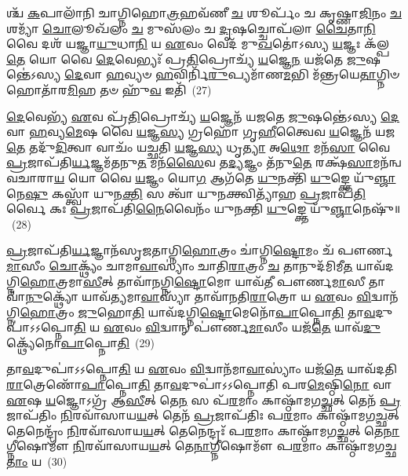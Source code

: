 𑌶𑍍𑌚᳴ \ul{𑌕}\-𑌪𑌾𑌲𑌾᳴𑌨𑌿 𑌚𑌾𑌗𑍍𑌨𑌿𑌹𑍋\-\ul{𑌤𑍍𑌰}\-𑌹𑌵᳴𑌣𑍀 \ul{𑌚} 𑌶𑍂𑌰𑍍𑌪𑌂᳴ 𑌚 𑌕𑍃𑌷𑍍𑌣𑌾\-\ul{𑌜𑌿}\-𑌨𑌂 \ul{𑌚} 𑌶𑌮𑍍𑌯𑌾᳴ \ul{𑌚𑍋}\-𑌲𑍂𑌖᳴𑌲𑌂 \ul{𑌚} 𑌮𑍁𑌸᳴𑌲𑌂 𑌚 \ul{𑌦𑍃}\-𑌷𑌚𑍍𑌚𑍋𑌪᳴𑌲𑌾 \ul{𑌚𑍈}\-𑌤𑌾\-\ul{𑌨𑌿} 𑌵𑍈 𑌦𑌶᳴ 𑌯𑌜𑍍𑌞𑌾\-\ul{𑌯𑍁}\-𑌧𑌾\-\ul{𑌨𑌿} 𑌯 \ul{𑌏}\-𑌵𑌂 𑌵𑍇𑌦᳴ 𑌮𑍁\-\ul{𑌖}\-𑌤𑍋॑\-𑌽𑌸𑍍𑌯 \ul{𑌯}\-𑌜𑍍𑌞𑌃 𑌕᳴𑌲𑍍𑌪\-\ul{𑌤𑍇} 𑌯𑍋 𑌵𑍈 \ul{𑌦𑍇}\-𑌵𑍇𑌭𑍍𑌯𑌃᳴ 𑌪𑍍𑌰\-\ul{𑌤𑌿}\-𑌪𑍍𑌰𑍋𑌚𑍍𑌯᳴ \ul{𑌯}\-𑌜𑍍𑌞𑍇\-\ul{𑌨} 𑌯𑌜᳴𑌤𑍇 \ul{𑌜𑍁}\-𑌷𑌨𑍍𑌤𑍇॑\-𑌽𑌸𑍍𑌯 \ul{𑌦𑍇}\-𑌵𑌾 \ul{𑌹}\-𑌵𑍍𑌯𑍞 \ul{𑌹}\-𑌵𑌿𑌰𑍍𑌨𑌿᳴\-\ul{𑌰𑍁}\-𑌪𑍍𑌯𑌮𑌾᳴𑌣\-\ul{𑌮}\-𑌭𑌿 𑌮᳴𑌨𑍍𑌤𑍍𑌰𑌯𑍇\-\ul{𑌤𑌾}\-𑌗𑍍𑌨𑌿𑍞 𑌹𑍋𑌤𑌾᳴𑌰\-\ul{𑌮𑌿}\-𑌹 𑌤𑍞 𑌹𑍁᳴\-\ul{𑌵} 𑌇𑌤𑌿᳴~(27)

\-\ul{𑌦𑍇}\-𑌵𑍇𑌭𑍍𑌯᳴ \ul{𑌏}\-𑌵 𑌪𑍍𑌰᳴\-\ul{𑌤𑌿}\-𑌪𑍍𑌰𑍋𑌚𑍍𑌯᳴ \ul{𑌯}\-𑌜𑍍𑌞𑍇𑌨᳴ 𑌯𑌜𑌤𑍇 \ul{𑌜𑍁}\-𑌷𑌨𑍍𑌤𑍇॑\-𑌽𑌸𑍍𑌯 \ul{𑌦𑍇}\-𑌵𑌾 \ul{𑌹}\-𑌵𑍍𑌯\-\ul{𑌮𑍇}\-𑌷 𑌵𑍈 \ul{𑌯}\-𑌜𑍍𑌞\-\ul{𑌸𑍍𑌯} 𑌗𑍍𑌰𑌹𑍋᳴ 𑌗𑍃\-\ul{𑌹𑍀}\-𑌤𑍍𑌵𑍈𑌵 \ul{𑌯}\-𑌜𑍍𑌞𑍇𑌨᳴ 𑌯𑌜\-\ul{𑌤𑍇} 𑌤𑌦𑍁᳴\-\ul{𑌦𑌿}\-𑌤𑍍𑌵𑌾 𑌵𑌾𑌚𑌂᳴ 𑌯𑌚𑍍𑌛𑌤𑌿 \ul{𑌯}\-𑌜𑍍𑌞\-\ul{𑌸𑍍𑌯} 𑌧𑍃\-\ul{𑌤𑍍𑌯𑌾} 𑌅\-\ul{𑌥𑍋} 𑌮𑌨᳴\-\ul{𑌸𑌾} 𑌵𑍈 \ul{𑌪𑍍𑌰}\-𑌜𑌾𑌪᳴𑌤𑌿\-\ul{𑌰𑍍𑌯}\-𑌜𑍍𑌞𑌮᳴𑌤𑌨𑍁\-\ul{𑌤} 𑌮𑌨᳴\-\ul{𑌸𑍈}\-𑌵 𑌤\-\ul{𑌦𑍍𑌯}\-𑌜𑍍𑌞𑌂 𑌤᳴𑌨𑍁\-\ul{𑌤𑍇} 𑌰𑌕𑍍𑌷᳴\-\ul{𑌸𑌾}\-𑌮𑌨᳴𑌨𑍍𑌵𑌵𑌚𑌾𑌰𑌾\-\ul{𑌯} 𑌯𑍋 𑌵𑍈 \ul{𑌯}\-𑌜𑍍𑌞𑌂 𑌯𑍋\-\ul{𑌗} 𑌆𑌗᳴𑌤𑍇 \ul{𑌯𑍁}\-𑌨𑌕𑍍𑌤𑌿᳴ \ul{𑌯𑍁}\-𑌙𑍍𑌕𑍍𑌤𑍇 𑌯𑍁᳴\-\ul{𑌞𑍍𑌜𑌾}\-𑌨𑍇\-\ul{𑌷𑍁} 𑌕𑌸𑍍𑌤𑍍𑌵𑌾᳴ 𑌯𑍁𑌨\-\ul{𑌕𑍍𑌤𑌿} 𑌸 𑌤𑍍𑌵𑌾᳴ 𑌯𑍁\-\ul{𑌨}\-𑌕𑍍𑌤𑍍𑌵𑌿𑌤𑍍𑌯𑌾᳴𑌹 \ul{𑌪𑍍𑌰}\-𑌜𑌾𑌪᳴\-\ul{𑌤𑌿}\-𑌰𑍍𑌵𑍈 𑌕𑌃 \ul{𑌪𑍍𑌰}\-𑌜𑌾𑌪᳴𑌤𑌿\-\ul{𑌨𑍈}\-𑌵𑍈𑌨𑌂᳴ 𑌯𑍁𑌨𑌕𑍍𑌤𑌿 \ul{𑌯𑍁}\-𑌙𑍍𑌕𑍍𑌤𑍇 𑌯𑍁᳴\-\ul{𑌞𑍍𑌜𑌾}\-𑌨𑍇𑌷𑍁᳴॥~(28)

{\anuvakamend[{𑌵𑍈 𑌮\-\ul{𑌨𑌃} 𑌸𑍍𑌫𑍍𑌯 𑌇𑌤𑌿᳴ 𑌯𑍁\-\ul{𑌨}\-𑌕𑍍𑌤𑍍𑌵𑍇𑌕𑌾᳴\-𑌦𑌶 𑌚}]}%

\-\ul{𑌪𑍍𑌰}\-𑌜𑌾𑌪᳴𑌤𑌿\-\ul{𑌰𑍍𑌯}\-𑌜𑍍𑌞𑌾𑌨᳴𑌸𑍃𑌜𑌤𑌾𑌗𑍍𑌨𑌿\-\ul{𑌹𑍋}\-𑌤𑍍𑌰𑌂 𑌚𑌾॑𑌗𑍍𑌨𑌿\-\ul{𑌷𑍍𑌟𑍋}\-𑌮𑌂 𑌚᳴ 𑌪𑍗𑌰𑍍𑌣\-\ul{𑌮𑌾}\-𑌸𑍀𑌂 \ul{𑌚𑍋}\-𑌕𑍍𑌥𑍍𑌯𑌂᳴ 𑌚𑌾𑌮𑌾\-\ul{𑌵𑌾}\-𑌸𑍍𑌯𑌾𑌂॑ 𑌚𑌾𑌤𑌿\-\ul{𑌰𑌾}\-𑌤𑍍𑌰𑌂 \ul{𑌚} 𑌤𑌾𑌨𑍁𑌦᳴𑌮𑌿𑌮𑍀\-\ul{𑌤} 𑌯𑌾𑌵᳴𑌦𑌗𑍍𑌨𑌿\-\ul{𑌹𑍋}\-𑌤𑍍𑌰𑌮𑌾\-\ul{𑌸𑍀}\-𑌤𑍍 𑌤𑌾𑌵𑌾᳴𑌨𑌗𑍍𑌨𑌿\-\ul{𑌷𑍍𑌟𑍋}\-𑌮𑍋 𑌯𑌾𑌵᳴𑌤𑍀 𑌪𑍗𑌰𑍍𑌣\-\ul{𑌮𑌾}\-𑌸𑍀 𑌤𑌾𑌵𑌾᳴\-\ul{𑌨𑍁}\-𑌕𑍍𑌥𑍍𑌯𑍋᳴ 𑌯𑌾𑌵᳴𑌤𑍍𑌯𑌮𑌾\-\ul{𑌵𑌾}\-𑌸𑍍𑌯𑌾᳴ 𑌤𑌾𑌵𑌾᳴𑌨𑌤𑌿\-\ul{𑌰𑌾}\-𑌤𑍍𑌰𑍋 𑌯 \ul{𑌏}\-𑌵𑌂 \ul{𑌵𑌿}\-𑌦𑍍𑌵𑌾𑌨᳴𑌗𑍍𑌨𑌿\-\ul{𑌹𑍋}\-𑌤𑍍𑌰𑌂 \ul{𑌜𑍁}\-𑌹𑍋\-\ul{𑌤𑌿} 𑌯𑌾𑌵᳴𑌦𑌗𑍍𑌨𑌿\-\ul{𑌷𑍍𑌟𑍋}\-𑌮𑍇𑌨𑍋᳴\-\ul{𑌪𑌾}\-𑌪𑍍𑌨𑍋\-\ul{𑌤𑌿} 𑌤𑌾\-\ul{𑌵}\-𑌦𑍁𑌪𑌾॑\-𑌽\-𑌽𑌪𑍍𑌨𑍋\-\ul{𑌤𑌿} 𑌯 \ul{𑌏}\-𑌵𑌂 \ul{𑌵𑌿}\-𑌦𑍍𑌵𑌾𑌨𑍍 𑌪𑍗॑𑌰𑍍𑌣\-\ul{𑌮𑌾}\-𑌸𑍀𑌂 𑌯𑌜᳴\-\ul{𑌤𑍇} 𑌯𑌾𑌵᳴\-\ul{𑌦𑍁}\-𑌕𑍍𑌥𑍍𑌯𑍇᳴𑌨𑍋\-\ul{𑌪𑌾}\-𑌪𑍍𑌨𑍋\-\ul{𑌤𑌿}\-~(29)

𑌤𑌾\-\ul{𑌵}\-𑌦𑍁𑌪𑌾॑\-𑌽\-𑌽𑌪𑍍𑌨𑍋\-\ul{𑌤𑌿} 𑌯 \ul{𑌏}\-𑌵𑌂 \ul{𑌵𑌿}\-𑌦𑍍𑌵𑌾𑌨᳴𑌮𑌾\-\ul{𑌵𑌾}\-𑌸𑍍𑌯𑌾𑌂॑ 𑌯𑌜᳴\-\ul{𑌤𑍇} 𑌯𑌾𑌵᳴𑌦𑌤𑌿\-\ul{𑌰𑌾}\-𑌤𑍍𑌰𑍇𑌣𑍋᳴\-\ul{𑌪𑌾}\-𑌪𑍍𑌨𑍋\-\ul{𑌤𑌿} 𑌤𑌾\-\ul{𑌵}\-𑌦𑍁𑌪𑌾॑\-𑌽\-𑌽𑌪𑍍𑌨𑍋𑌤𑌿 𑌪𑌰\-\ul{𑌮𑍇}\-𑌷𑍍𑌠𑌿\-\ul{𑌨𑍋} 𑌵𑌾 \ul{𑌏}\-𑌷 \ul{𑌯}\-𑌜𑍍𑌞𑍋\-𑌽𑌗𑍍𑌰᳴ 𑌆\-\ul{𑌸𑍀}\-𑌤𑍍 𑌤𑍇\-\ul{𑌨} 𑌸 𑌪᳴\-\ul{𑌰}\-𑌮𑌾𑌂 𑌕𑌾𑌷𑍍𑌠𑌾᳴𑌮𑌗\-\ul{𑌚𑍍𑌛}\-𑌤𑍍 𑌤𑍇𑌨᳴ \ul{𑌪𑍍𑌰}\-𑌜𑌾𑌪᳴𑌤𑌿𑌂 \ul{𑌨𑌿}\-𑌰𑌵𑌾᳴𑌸𑌾𑌯\-\ul{𑌯}\-𑌤𑍍 𑌤𑍇𑌨᳴ \ul{𑌪𑍍𑌰}\-𑌜𑌾𑌪᳴𑌤𑌿𑌃 𑌪\-\ul{𑌰}\-𑌮𑌾𑌂 𑌕𑌾𑌷𑍍𑌠𑌾᳴𑌮𑌗\-\ul{𑌚𑍍𑌛}\-𑌤𑍍 𑌤𑍇𑌨𑍇𑌨𑍍𑌦𑍍𑌰𑌂᳴ \ul{𑌨𑌿}\-𑌰𑌵𑌾᳴𑌸𑌾𑌯\-\ul{𑌯}\-𑌤𑍍 𑌤𑍇𑌨𑍇𑌨𑍍𑌦𑍍𑌰𑌃᳴ 𑌪\-\ul{𑌰}\-𑌮𑌾𑌂 𑌕𑌾𑌷𑍍𑌠𑌾᳴𑌮𑌗\-\ul{𑌚𑍍𑌛}\-𑌤𑍍 𑌤𑍇\-\ul{𑌨𑌾}\-𑌗𑍍𑌨𑍀𑌷𑍋𑌮𑍗᳴ \ul{𑌨𑌿}\-𑌰𑌵𑌾᳴𑌸𑌾𑌯\-\ul{𑌯}\-𑌤𑍍 𑌤𑍇\-\ul{𑌨𑌾}\-𑌗𑍍𑌨𑍀𑌷𑍋𑌮𑍗᳴ 𑌪\-\ul{𑌰}\-𑌮𑌾𑌂 𑌕𑌾𑌷𑍍𑌠𑌾᳴𑌮𑌗𑌚𑍍𑌛\-\ul{𑌤𑌾𑌂} 𑌯~(30)

